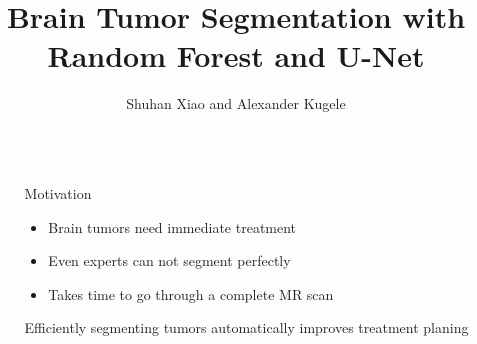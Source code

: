 \documentclass[final]{beamer}
\title{Brain Tumor Segmentation with Random Forest and U-Net} %
\author{Shuhan Xiao and Alexander Kugele} %
\institute{Heidelberg University} %
\newlength{\sepwid}
\newlength{\onecolwid}
\begin{document}

\setlength{\belowcaptionskip}{2ex} %
\setlength\belowdisplayshortskip{2ex} %

\begin{frame}[t] %

\begin{columns}[t] %

\begin{column}{\sepwid}\end{column} %

\begin{column}{\onecolwid} %

\begin{block}{Motivation}
\begin{itemize}[label={}]
\item Brain tumors need immediate treatment
\item Even experts can not segment perfectly
\item Takes time to go through a complete MR scan
\end{itemize}
Efficiently segmenting tumors automatically improves treatment planing
\end{block}


\end{column}
\end{columns}
\end{frame}
\end{document}
